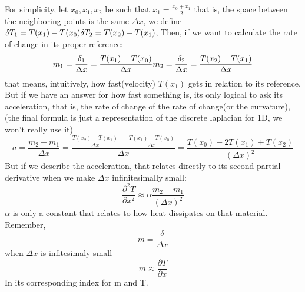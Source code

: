 \documentclass[12pt]{article}
\begin{document}
 For simplicity, let  $x_0, x_1, x_2$ be such that $x_1=\frac{x_0+x_1}{2}$ that is, the space between the neighboring points is the same $\Delta x$, we define $\\ \delta T_1 = T(x_1) - T(x_0) \\ \delta T_2 = T(x_2) - T(x_1) $, Then, if we want to calculate the rate of change in its proper reference:
 \[m_1 = \frac{\delta_1}{\Delta x} = \frac{T(x_1) - T(x_0)}{\Delta x}\\
 m_2 = \frac{\delta_2}{\Delta x} = \frac{T(x_2) - T(x_1)}{\Delta x}\]
 that means, intuitively, how fast(velocity) $T(x_1)$ gets in relation to its reference.
 But if we have an answer for how fast something is, its only logical to ask its acceleration, that is, the rate of change of the rate of change(or the curvature),(the final formula is just a representation of the discrete laplacian for 1D, we won't really use it)
 \[
a= \frac{m_2 - m_1}{\Delta x} = \frac{\frac{T(x_2) - T(x_1)}{\Delta x} - \frac{T(x_1) - T(x_0)}{\Delta x}}{\Delta x} = \frac{T(x_0) - 2T(x_1) + T(x_2)}{(\Delta x)^2}
 \]
 But if we describe the acceleration, that relates directly to its second partial derivative when we make \(\Delta x\) infinitesimally small:
 \[\frac{\partial ^2T}{\partial x^2}\approx \alpha\frac{m_2-m_1}{(\Delta x)^2}\]
\(\alpha\) is only a constant that relates to how heat dissipates on that material.
Remember,
\[
m=\frac{\delta}{\Delta x}
\]
when \(\Delta x\) is infitesimaly small
\[
m\approx \frac{\partial T}{\partial x}
\] 
In its corresponding index for m and T.
\end{document}
